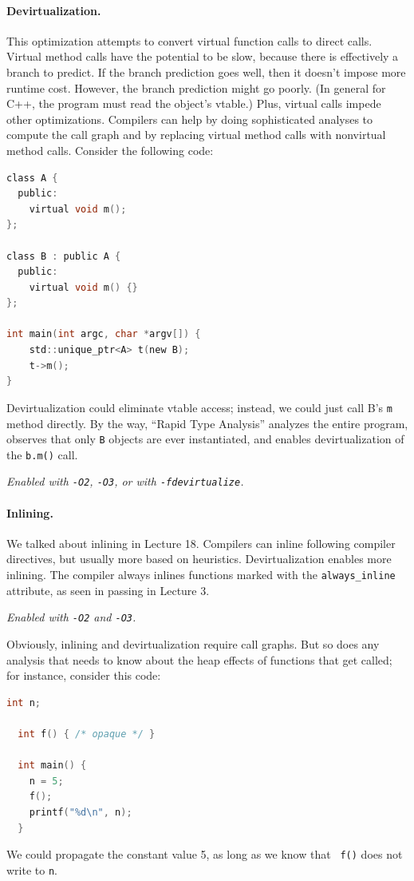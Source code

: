 \documentclass[a4paper]{report}
\begin{document}
\paragraph{Devirtualization.} This optimization attempts to convert
virtual function calls to direct calls.  Virtual method calls have the
potential to be slow, because there is effectively a branch to
predict. If the branch prediction goes well, then it doesn't impose
more runtime cost. However, the branch prediction might go poorly.  (In
general for C++, the program must read the object's vtable.) Plus, virtual
calls impede other optimizations. Compilers can help by doing
sophisticated analyses to compute the call graph and by replacing
virtual method calls with nonvirtual method calls.  Consider the
following code:
  \begin{lstlisting}[language=C]
class A {
  public:
    virtual void m();
};

class B : public A {
  public:
    virtual void m() {}
};

int main(int argc, char *argv[]) {
    std::unique_ptr<A> t(new B);
    t->m();
}
  \end{lstlisting}
Devirtualization could eliminate vtable access; instead, we could just call B's {\tt m} method
directly. By the way, ``Rapid Type Analysis'' analyzes the entire program, observes that
only {\tt B} objects are ever instantiated, and enables devirtualization
of the {\tt b.m()} call.

\noindent \emph{Enabled with {\tt -O2}, {\tt -O3}, or with {\tt -fdevirtualize}.}

\paragraph{Inlining.} We talked about inlining in Lecture 18. Compilers can inline following compiler directives, but usually more based on heuristics. Devirtualization enables more inlining. The compiler always inlines functions marked with the {\tt always\_inline} attribute, as seen in passing in Lecture 3.

\noindent \emph{Enabled with {\tt -O2} and {\tt -O3}.}

Obviously, inlining and devirtualization require call graphs. But so
does any analysis that needs to know about the heap effects of
functions that get called; for instance, consider this code:

{\small
\begin{lstlisting}[language=C]
  int n;

  int f() { /* opaque */ }

  int main() {
    n = 5;
    f();
    printf("%d\n", n);
  }
\end{lstlisting}
}
We could propagate the constant value 5, as long as we know that {\tt
  f()} does not write to {\tt n}.
\end{document}
